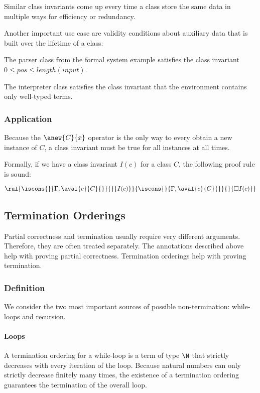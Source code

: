Similar class invariants come up every time a class store the same data in multiple ways for efficiency or redundancy.

Another important use case are validity conditions about auxiliary data that is built over the lifetime of a class:

\begin{example}
The parser class from the formal system example satisfies the class invariant $0\leq pos\leq length(input)$.

The interpreter class satisfies the class invariant that the environment contains only well-typed terms.
\end{example}


\subsubsection{Application}

Because the $\anew{C}{x}$ operator is the only way to every obtain a new instance of $C$, a class invariant must be true for all instances at all times.

Formally, if we have a class invariant $I(c)$ for a class $C$, the following proof rule is sound:

\[\rul{\iscons{}{\Gamma,\aval{c}{C}{}}{}{I(c)}}
      {\iscons{}{\Gamma,\aval{c}{C}{}}{}{\square I(c)}}\]

\subsection{Termination Orderings}

Partial correctness and termination usually require very different arguments.
Therefore, they are often treated separately.
The annotations described above help with proving partial correctness.
Termination orderings help with proving termination.

\subsubsection{Definition}

We consider the two most important sources of possible non-termination: while-loops and recursion.

\paragraph{Loops}
A termination ordering for a while-loop is a term of type $\N$ that strictly decreases with every iteration of the loop.
Because natural numbers can only strictly decrease finitely many times, the existence of a termination ordering guarantees the termination of the overall loop.

